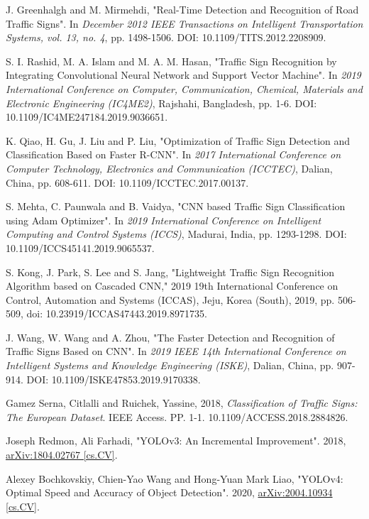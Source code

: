 \documentclass[10pt,twocolumn,letterpaper]{article}
\begin{document}
\begin{thebibliography}{9}
		J. Greenhalgh and M. Mirmehdi, "Real-Time Detection and Recognition of Road Traffic Signs". In \textit{December 2012 IEEE Transactions on Intelligent Transportation Systems, vol. 13, no. 4}, pp. 1498-1506. DOI: 10.1109/TITS.2012.2208909.
		
		S. I. Rashid, M. A. Islam and M. A. M. Hasan, "Traffic Sign Recognition by Integrating Convolutional Neural Network and Support Vector Machine". In  \textit{2019 International Conference on Computer, Communication, Chemical, Materials and Electronic Engineering (IC4ME2)}, Rajshahi, Bangladesh, pp. 1-6. DOI: 10.1109/IC4ME247184.2019.9036651.
	
		K. Qiao, H. Gu, J. Liu and P. Liu, "Optimization of Traffic Sign Detection and Classification Based on Faster R-CNN". In \textit{2017 International Conference on Computer Technology, Electronics and Communication (ICCTEC)}, Dalian, China, pp. 608-611. DOI: 10.1109/ICCTEC.2017.00137.
		
		S. Mehta, C. Paunwala and B. Vaidya, "CNN based Traffic Sign Classification using Adam Optimizer". In \textit{2019 International Conference on Intelligent Computing and Control Systems (ICCS)}, Madurai, India, pp. 1293-1298. DOI: 10.1109/ICCS45141.2019.9065537.
		
	S. Kong, J. Park, S. Lee and S. Jang, "Lightweight Traffic Sign Recognition Algorithm based on Cascaded CNN," 2019 19th International Conference on Control, Automation and Systems (ICCAS), Jeju, Korea (South), 2019, pp. 506-509, doi: 10.23919/ICCAS47443.2019.8971735.
	
		J. Wang, W. Wang and A. Zhou, "The Faster Detection and Recognition of Traffic Signs Based on CNN". In \textit{2019 IEEE 14th International Conference on Intelligent Systems and Knowledge Engineering (ISKE)}, Dalian, China, pp. 907-914. DOI: 10.1109/ISKE47853.2019.9170338.
		
		Gamez Serna, Citlalli and Ruichek, Yassine, 2018, \textit{Classification of Traffic Signs: The European Dataset}. IEEE Access. PP. 1-1. 10.1109/ACCESS.2018.2884826. 
		
		Joseph Redmon, Ali Farhadi, "YOLOv3: An Incremental Improvement". 2018, \href{https://arxiv.org/abs/1804.02767}{arXiv:1804.02767 [cs.CV]}.
		
		Alexey Bochkovskiy, Chien-Yao Wang and Hong-Yuan Mark Liao, "YOLOv4: Optimal Speed and Accuracy of Object Detection". 2020, \href{https://arxiv.org/abs/2004.10934}{arXiv:2004.10934 [cs.CV]}.
		

\end{thebibliography}
\end{document}
